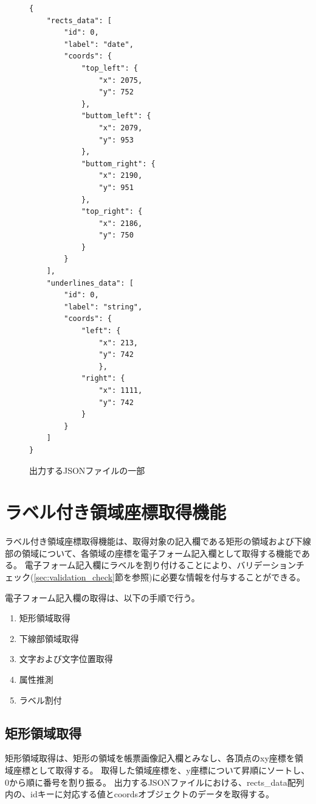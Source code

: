 \lstset{language=}
\begin{figure}[t]
    \begin{lstlisting}
{
    "rects_data": [
        "id": 0, 
        "label": "date",
        "coords": {
            "top_left": {
                "x": 2075,
                "y": 752
            },
            "buttom_left": {
                "x": 2079,
                "y": 953
            },
            "buttom_right": {
                "x": 2190,
                "y": 951
            },
            "top_right": {
                "x": 2186,
                "y": 750
            }
        }
    ],
    "underlines_data": [
        "id": 0,
        "label": "string",
        "coords": {
            "left": {
                "x": 213,
                "y": 742
                },
            "right": {
                "x": 1111,
                "y": 742
            }
        }
    ]
}
    \end{lstlisting}
    \caption{出力するJSONファイルの一部}\label{fig:example_output_json}
\end{figure}

\section{ラベル付き領域座標取得機能}\label{sec:eform_write_space_obtainment_feature}
ラベル付き領域座標取得機能は、取得対象の記入欄である矩形の領域および下線部の領域について、各領域の座標を電子フォーム記入欄として取得する機能である。
電子フォーム記入欄にラベルを割り付けることにより、バリデーションチェック(\ref{sec:validation_check}節を参照)に必要な情報を付与することができる。

電子フォーム記入欄の取得は、以下の手順で行う。

\begin{enumerate}
    \item 矩形領域取得
    \item 下線部領域取得
    \item 文字および文字位置取得
    \item 属性推測
    \item ラベル割付
\end{enumerate}

\subsection{矩形領域取得}\label{subsec:rect_coords_obtainment}
矩形領域取得は、矩形の領域を帳票画像記入欄とみなし、各頂点のxy座標を領域座標として取得する。
取得した領域座標を、y座標について昇順にソートし、0から順に番号を割り振る。
出力するJSONファイルにおける、rects\_data配列内の、idキーに対応する値とcoordsオブジェクトのデータを取得する。

